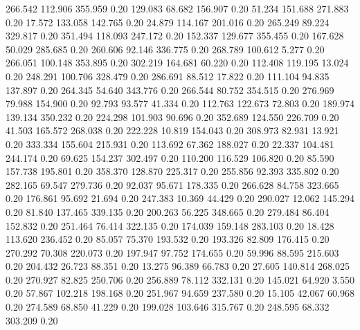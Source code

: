  266.542  112.906  355.959         0.20
 129.083   68.682  156.907         0.20
  51.234  151.688  271.883         0.20
  17.572  133.058  142.765         0.20
  24.879  114.167  201.016         0.20
 265.249   89.224  329.817         0.20
 351.494  118.093  247.172         0.20
 152.337  129.677  355.455         0.20
 167.628   50.029  285.685         0.20
 260.606   92.146  336.775         0.20
 268.789  100.612    5.277         0.20
 266.051  100.148  353.895         0.20
 302.219  164.681   60.220         0.20
 112.408  119.195   13.024         0.20
 248.291  100.706  328.479         0.20
 286.691   88.512   17.822         0.20
 111.104   94.835  137.897         0.20
 264.345   54.640  343.776         0.20
 266.544   80.752  354.515         0.20
 276.969   79.988  154.900         0.20
  92.793   93.577   41.334         0.20
 112.763  122.673   72.803         0.20
 189.974  139.134  350.232         0.20
 224.298  101.903   90.696         0.20
 352.689  124.550  226.709         0.20
  41.503  165.572  268.038         0.20
 222.228   10.819  154.043         0.20
 308.973   82.931   13.921         0.20
 333.334  155.604  215.931         0.20
 113.692   67.362  188.027         0.20
  22.337  104.481  244.174         0.20
  69.625  154.237  302.497         0.20
 110.200  116.529  106.820         0.20
  85.590  157.738  195.801         0.20
 358.370  128.870  225.317         0.20
 255.856   92.393  335.802         0.20
 282.165   69.547  279.736         0.20
  92.037   95.671  178.335         0.20
 266.628   84.758  323.665         0.20
 176.861   95.692   21.694         0.20
 247.383   10.369   44.429         0.20
 290.027   12.062  145.294         0.20
  81.840  137.465  339.135         0.20
 200.263   56.225  348.665         0.20
 279.484   86.404  152.832         0.20
 251.464   76.414  322.135         0.20
 174.039  159.148  283.103         0.20
  18.428  113.620  236.452         0.20
  85.057   75.370  193.532         0.20
 193.326   82.809  176.415         0.20
 270.292   70.308  220.073         0.20
 197.947   97.752  174.655         0.20
  59.996   88.595  215.603         0.20
 204.432   26.723   88.351         0.20
  13.275   96.389   66.783         0.20
  27.605  140.814  268.025         0.20
 270.927   82.825  250.706         0.20
 256.889   78.112  332.131         0.20
 145.021   64.920    3.550         0.20
  57.867  102.218  198.168         0.20
 251.967   94.659  237.580         0.20
  15.105   42.067   60.968         0.20
 274.589   68.850   41.229         0.20
 199.028  103.646  315.767         0.20
 248.595   68.332  303.209         0.20

